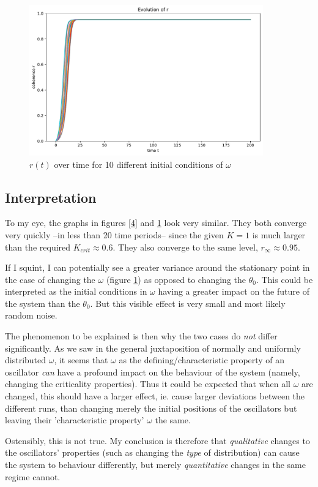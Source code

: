 \documentclass[11pt,a4paper]{article}
\newcommand{\graph}{\medskip\noindent}
\begin{document}
\begin{figure}[H]
	\centering
	\includegraphics[width=0.9\textwidth]{graphics/5_t-vs-r_fixedThetas_omegaDistr=uniform_N=2000_1611572031.pdf}
	\caption{$r(t)$ over time for 10 different initial conditions of $\omega$}
	\label{5}
\end{figure}





\subsection{Interpretation}

To my eye, the graphs in figures \ref{4} and \ref{5} look very similar. 
They both converge very quickly --in less than 20 time periods-- since the given $K = 1$ is much larger than the required $K_{crit} \approx 0.6$. 
They also converge to the same level, $r_\infty \approx 0.95$. 

If I squint, I can potentially see a greater variance around the stationary point in the case of changing the $\omega$ (figure \ref{5}) as opposed to changing the $\theta_0$. 
This could be interpreted as the initial conditions in $\omega$ having a greater impact on the future of the system than the $\theta_0$. 
But this visible effect is very small and most likely random noise. 

\graph
The phenomenon to be explained is then why the two cases do \textit{not} differ significantly. 
As we saw in the general juxtaposition of normally and uniformly distributed $\omega$, it seems that $\omega$ as the defining/characteristic property of an oscillator \textit{can} have a profound impact on the behaviour of the system (namely, changing the criticality properties). 
Thus it could be expected that when all $\omega$ are changed, this should have a larger effect, ie. cause larger deviations between the different runs, than changing merely the initial positions of the oscillators but leaving their 'characteristic property' $\omega$ the same.

Ostensibly, this is not true. 
My conclusion is therefore that \textit{qualitative} changes to the oscillators' properties (such as changing the \textit{type} of distribution) can cause the system to behaviour differently, but merely \textit{quantitative} changes in the same regime cannot.
\end{document}
